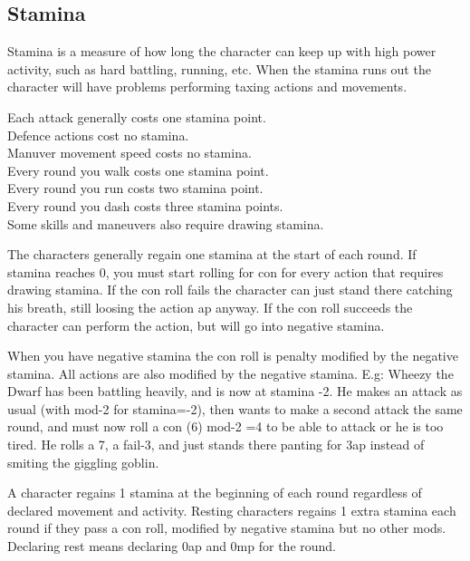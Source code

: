 



\subsection*{Stamina}
Stamina is a measure of how long the character can keep up with high power activity, such as hard battling, running, etc. When the stamina runs out the character will have problems performing taxing actions and movements.

\noindent
Each attack generally costs one stamina point. \\
Defence actions cost no stamina.\\ 
Manuver movement speed costs no stamina.\\ 
Every round you walk costs one stamina point. \\
Every round you run costs two stamina point. \\
Every round you dash costs three stamina points. \\
Some skills and maneuvers also require drawing stamina.

The characters generally regain one stamina at the start of each round. If stamina reaches 0, you must start rolling for con for every action that requires drawing stamina. If the con roll fails the character can just stand there catching his breath, still loosing the action ap anyway. If the con roll succeeds the character can perform the action, but will go into negative stamina.

When you have negative stamina the con roll is penalty modified by the negative stamina. All actions are also modified by the negative stamina.
E.g: Wheezy the Dwarf has been battling heavily, and is now at stamina -2. He makes an attack as usual (with mod-2 for stamina=-2), then wants to make a second attack the same round, and must now roll a con (6) mod-2 =4 to be able to attack or he is too tired. He rolls a 7, a fail-3, and just stands there panting for 3ap instead of smiting the giggling goblin.

A character regains 1 stamina at the beginning of each round regardless of declared movement and activity. Resting characters regains 1 extra stamina each round if they pass a con roll, modified by negative stamina but no other mods. Declaring rest means declaring 0ap and 0mp for the round.

